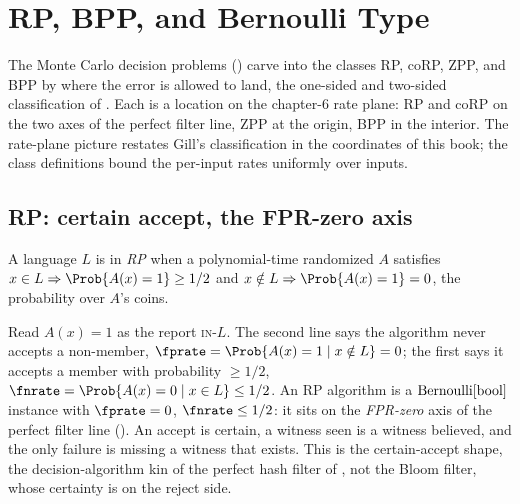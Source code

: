 %

\section{RP, BPP, and Bernoulli Type}
\label{sec:rp-bpp}

The Monte Carlo decision problems () carve into the
classes RP, coRP, ZPP, and BPP by where the error is allowed to land, the
one-sided and two-sided classification of \textcite{gill-1977}. Each is a
location on the chapter-6 rate plane: RP and coRP on the two axes of the perfect
filter line, ZPP at the origin, BPP in the interior. The rate-plane picture
restates Gill's classification in the coordinates of this book; the class
definitions bound the per-input rates uniformly over inputs.

\subsection*{RP: certain accept, the FPR-zero axis}

\begin{definition}
\label{def:rp}
A language $L$ is in \emph{RP} when a polynomial-time randomized $A$ satisfies
$x \in L \Rightarrow \Prob{A(x) = 1} \ge 1/2$ and $x \notin L \Rightarrow
\Prob{A(x) = 1} = 0$, the probability over $A$'s coins.
\end{definition}

Read $A(x) = 1$ as the report \textsc{in-}$L$. The second line says the algorithm
never accepts a non-member, $\fprate = \Prob{A(x) = 1 \mid x \notin L} = 0$; the
first says it accepts a member with probability $\ge 1/2$, $\fnrate = \Prob{A(x)
= 0 \mid x \in L} \le 1/2$. An RP algorithm is a $\mathrm{Bernoulli}[\mathrm{bool}]$ instance
with $\fprate = 0$, $\fnrate \le 1/2$: it sits on the \emph{FPR-zero} axis of the
perfect filter line (). An accept is certain, a
witness seen is a witness believed, and the only failure is missing a witness
that exists. This is the certain-accept shape, the decision-algorithm kin of the
perfect hash filter of , not the Bloom filter,
whose certainty is on the reject side.

